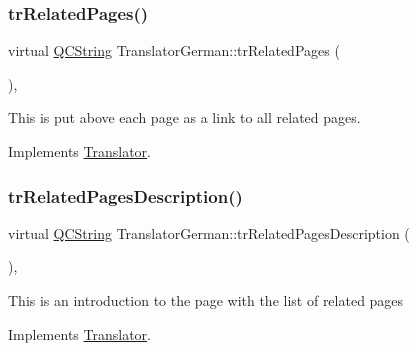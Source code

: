 \mbox{\label{class_translator_german_ac5acdbc64d61a0508bf1d528a7daa1e0}} 
\subsubsection{\texorpdfstring{trRelatedPages()}{trRelatedPages()}}
{\footnotesize\ttfamily virtual \mbox{\hyperlink{class_q_c_string}{Q\+C\+String}} Translator\+German\+::tr\+Related\+Pages (\begin{DoxyParamCaption}{ }\end{DoxyParamCaption})\hspace{0.3cm}{\ttfamily [inline]}, {\ttfamily [virtual]}}

This is put above each page as a link to all related pages. 

Implements \mbox{\hyperlink{class_translator}{Translator}}.

\mbox{\label{class_translator_german_ae74a7532341ddcf496ab7832a4622c05}} 
\subsubsection{\texorpdfstring{trRelatedPagesDescription()}{trRelatedPagesDescription()}}
{\footnotesize\ttfamily virtual \mbox{\hyperlink{class_q_c_string}{Q\+C\+String}} Translator\+German\+::tr\+Related\+Pages\+Description (\begin{DoxyParamCaption}{ }\end{DoxyParamCaption})\hspace{0.3cm}{\ttfamily [inline]}, {\ttfamily [virtual]}}

This is an introduction to the page with the list of related pages 

Implements \mbox{\hyperlink{class_translator}{Translator}}.

\mbox{\label{class_translator_german_ac69025a38319096b71af9041f6a82122}} 
